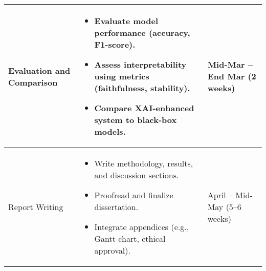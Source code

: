 \begin{longtable}{|p{5cm}|p{6cm}|p{4cm}|}
Evaluation and Comparison & 
\begin{itemize}
    \item Evaluate model performance (accuracy, F1-score).
    \item Assess interpretability using metrics (faithfulness, stability).
    \item Compare XAI-enhanced system to black-box models.
\end{itemize} & 
Mid-Mar -- End Mar (2 weeks) \\
\hline

Report Writing & 
\begin{itemize}
    \item Write methodology, results, and discussion sections.
    \item Proofread and finalize dissertation.
    \item Integrate appendices (e.g., Gantt chart, ethical approval).
\end{itemize} & 
April -- Mid-May (5--6 weeks) \\
\hline

\end{longtable}

